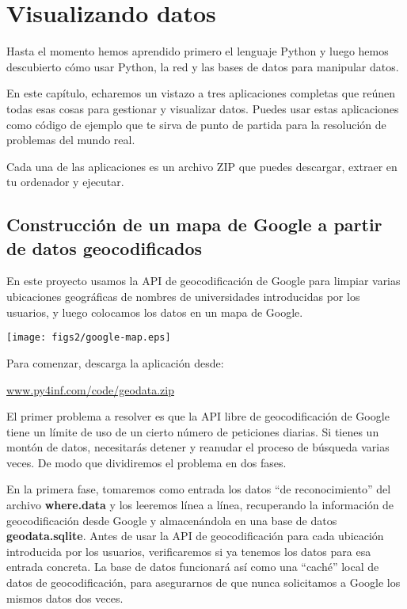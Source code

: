 
\chapter{Visualizando datos}

Hasta el momento hemos aprendido primero el lenguaje Python y luego
hemos descubierto cómo usar Python, la red y las bases de datos
para manipular datos.

En este capítulo, echaremos un vistazo a tres
aplicaciones completas que reúnen todas esas cosas
para gestionar y visualizar datos. Puedes usar estas aplicaciones
como código de ejemplo que te sirva de punto de partida para la
resolución de problemas del mundo real.

Cada una de las aplicaciones es un archivo ZIP que puedes descargar,
extraer en tu ordenador y ejecutar.

\section{Construcción de un mapa de Google a partir de datos geocodificados}

En este proyecto usamos la API de geocodificación de Google
para limpiar varias ubicaciones geográficas de nombres de universidades
introducidas por los usuarios, y luego colocamos los datos en
un mapa de Google. 

\beforefig
\centerline{\texttt{[image: figs2/google-map.eps]}}
\afterfig

Para comenzar, descarga la aplicación desde:

\url{www.py4inf.com/code/geodata.zip}

El primer problema a resolver es que la API libre de geocodificación
de Google tiene un límite de uso de un cierto número de peticiones diarias. Si tienes
un montón de datos, necesitarás detener y reanudar el proceso de
búsqueda varias veces. De modo que dividiremos el problema en
dos fases.

En la primera fase, tomaremos como entrada los datos ``de reconocimiento'' del archivo
{\bf where.data} y los leeremos línea a línea, recuperando la
información de geocodificación desde Google y almacenándola
en una base de datos {\bf geodata.sqlite}.
Antes de usar la API de geocodificación para cada ubicación introducida por los usuarios,
verificaremos si ya tenemos los datos para esa entrada
concreta. La base de datos funcionará así como una ``caché'' local
de datos de geocodificación, para asegurarnos de que nunca solicitamos
a Google los mismos datos dos veces.

